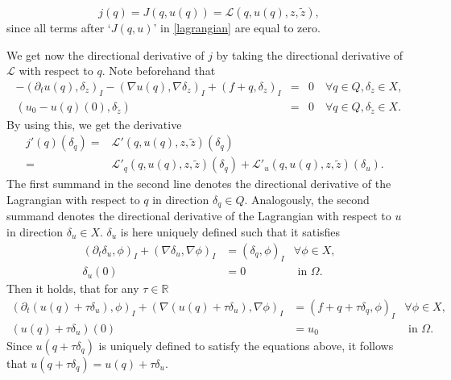 \begin{displaymath}
j(q)=J(q, u(q))=\mathcal{L}(q,u(q),z,\tilde{z}),
\end{displaymath}
since all terms after `$J(q,u)$' in \eqref{lagrangian} are equal to zero.

We get now the directional derivative of $j$ by taking the directional derivative of $\mathcal{L}$ with respect to $q$. Note beforehand that 
\begin{eqnarray*}
-(\partial_tu(q),\delta_z)_I-(\nabla u(q), \nabla \delta_z)_I+(f+q, \delta_z)_I&=&0\quad\forall q\in Q, \delta_z\in X,\\
(u_0-u(q)(0), \delta_{\tilde{z}})&=&0\quad\forall q\in Q, \delta_{\tilde{z}}\in X.
\end{eqnarray*}
By using this, we get the derivative
\begin{equation}
\label{LagrangianDerivative}
\begin{aligned}
j'(q)(\delta_q)=&\mathcal{L}'(q,u(q),z,\tilde{z})(\delta_q)&\\
=&\mathcal{L}'_q(q, u(q), z, \tilde{z})(\delta_q)+\mathcal{L}'_u(q,u(q),z,\tilde{z})(\delta_u).&
\end{aligned}
\end{equation}
The first summand in the second line denotes the directional derivative of the Lagrangian with respect to $q$ in direction $\delta_q\in Q$. Analogously, the second summand denotes the directional derivative of the Lagrangian with respect to $u$ in direction $\delta_u\in X$. $\delta_u$ is here uniquely defined such that it satisfies
\begin{equation*}
\begin{aligned}
	(\partial_t\delta_u,\phi)_I+(\nabla \delta_u,\nabla\phi)_I&=(\delta_q,\phi)_I&\forall\phi\in X,\\
	\delta_u(0)&=0&\text{ in }\Omega.
\end{aligned}
\end{equation*}
Then it holds, that for any $\tau\in\mathbb{R}$
\begin{equation*}
\begin{aligned}
	(\partial_t(u(q)+\tau\delta_u),\phi)_I+(\nabla (u(q)+\tau\delta_u),\nabla\phi)_I&=(f+q+\tau\delta_q,\phi)_I&\forall\phi\in X,\\
	(u(q)+\tau\delta_u)(0)&=u_0&\text{ in }\Omega.
\end{aligned}
\end{equation*}
Since $u(q+\tau\delta_q)$ is uniquely defined to satisfy the equations above, it follows that $u(q+\tau\delta_q)=u(q)+\tau\delta_u$.

